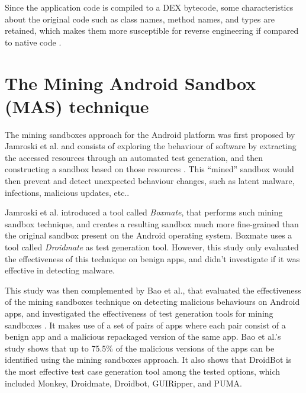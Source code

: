 Since the application code is compiled to a DEX bytecode, some characteristics about the original code such as class names, method names, and types are retained, which makes them more susceptible for reverse engineering if compared to native code \cite{hamilton_evaluation_2009}.

\section{The Mining Android Sandbox (MAS) technique}

The mining sandboxes approach for the Android platform was first proposed by Jamroski et al. and consists of exploring the behaviour of software by extracting the accessed resources through an automated test generation, and then constructing a sandbox based on those resources \cite{jamrozik_mining_2016}. This ``mined'' sandbox would then prevent and detect unexpected behaviour changes, such as latent malware, infections, malicious updates, etc..

Jamroski et al. introduced a tool called \textit{Boxmate}, that performs such mining sandbox technique, and creates a resulting sandbox much more fine-grained than the original sandbox present on the Android operating system. Boxmate uses a tool called \textit{Droidmate} as test generation tool. However, this study only evaluated the effectiveness of this technique on benign apps, and didn't investigate if it was effective in detecting malware.

This study was then complemented by Bao et al., that evaluated the effectiveness of the mining sandboxes technique on detecting malicious behaviours on Android apps, and investigated the effectiveness of test generation tools for mining sandboxes \cite{bao_mining_2018}. It makes use of a set of pairs of apps where each pair consist of a benign app and a malicious repackaged version of the same app. Bao et al.'s study shows that up to 75.5\% of the malicious versions of the apps can be identified using the mining sandboxes approach. It also shows that DroidBot \cite{li_droidbot_2017} is the most effective test case generation tool among the tested options, which included Monkey, Droidmate, Droidbot, GUIRipper, and PUMA.


